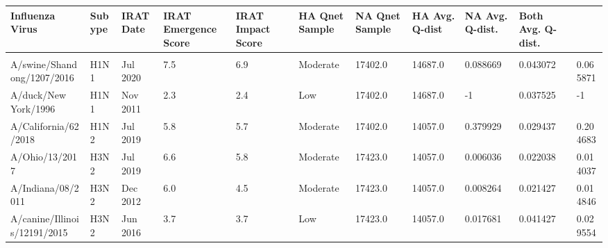 \begin{tabular}{L{1.9in}|L{.35in}|L{.35in}|L{.35in}|L{.35in}|L{.35in}|L{.35in}|L{.42in}|L{.42in}|L{.42in}}\hline
Influenza Virus & Subype & IRAT Date &IRAT Emergence Score &IRAT Impact Score &HA Qnet Sample &NA Qnet Sample &HA Avg. Q-dist &NA Avg. Q-dist. &Both Avg. Q-dist. \\\hline\\\hline
A/swine/Shandong/1207/2016 & H1N1 & Jul 2020 & 7.5 &6.9 &Moderate & 17402.0 & 14687.0 &0.088669 &0.043072 &0.065871 \\\hline
A/duck/New York/1996 & H1N1 & Nov 2011 & 2.3 &2.4 & Low & 17402.0 & 14687.0 & -1 &0.037525 & -1 \\
A/California/62/2018 & H1N2 & Jul 2019 & 5.8 &5.7 &Moderate & 17402.0 & 14057.0 &0.379929 &0.029437 &0.204683 \\\hline
A/Ohio/13/2017 & H3N2 & Jul 2019 & 6.6 &5.8 &Moderate & 17423.0 & 14057.0 &0.006036 &0.022038 &0.014037 \\\hline
 A/Indiana/08/2011 & H3N2 & Dec 2012 & 6.0 &4.5 &Moderate & 17423.0 & 14057.0 &0.008264 &0.021427 &0.014846 \\\hline
A/canine/Illinois/12191/2015 & H3N2 & Jun 2016 & 3.7 &3.7 & Low & 17423.0 & 14057.0 &0.017681 &0.041427 &0.029554 \\\hline
\end{tabular}
